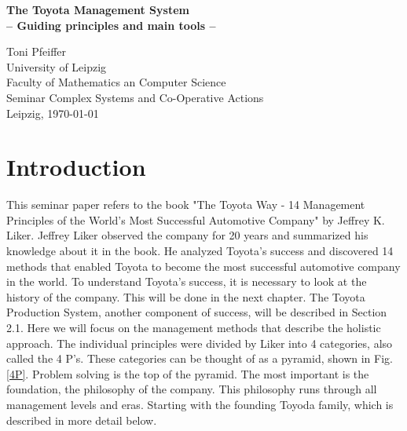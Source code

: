 \documentclass[a4paper,12pt]{scrartcl}
\begin{document}
\begin{titlepage}
\begin{center}


\vspace*{1cm}

\bigskip
\bigskip
\large


\bigskip
\bigskip
\bigskip
\bigskip
\bigskip
\bigskip
\bigskip
\bigskip
\bigskip
{\LARGE \bfseries The Toyota Management System   }\\
{\bfseries -- Guiding principles and main tools --}


\bigskip
\bigskip
\bigskip
\bigskip

Toni Pfeiffer \\

\bigskip
\bigskip
\bigskip
\bigskip
\bigskip
\bigskip
\bigskip
\bigskip
\bigskip
\bigskip
\bigskip
\bigskip
\bigskip
\bigskip
\bigskip
University of Leipzig \\
\bigskip
\bigskip
Faculty of Mathematics an Computer Science \\
\bigskip
Seminar Complex Systems and Co-Operative Actions \\
\bigskip
\bigskip
\bigskip
\bigskip
\bigskip
\bigskip
\bigskip
\bigskip
\bigskip
\bigskip
\bigskip
\bigskip
\bigskip
\bigskip
\bigskip
\bigskip
Leipzig, \today

\end{center}

\bigskip
\bigskip
\bigskip
\bigskip
\bigskip

\end{titlepage}

\clearpage
\tableofcontents
\clearpage
\clearpage
{}
\listoffigures
\clearpage

\section{Introduction}

This seminar paper refers to the book "The Toyota Way - 14 Management Principles of the World's Most Successful Automotive Company" by Jeffrey K. Liker. Jeffrey Liker observed the company for 20 years and summarized his knowledge about it in the book. He analyzed Toyota's success and discovered 14 methods that enabled Toyota to become the most successful automotive company in the world. To understand Toyota's success, it is necessary to look at the history of the company. This will be done in the next chapter. The Toyota Production System, another component of success, will be described in Section 2.1. Here we will focus on the management methods that describe the holistic approach. The individual principles were divided by Liker into 4 categories, also called the 4 P's. These categories can be thought of as a pyramid, shown in Fig. \ref{4P}. Problem solving is the top of the pyramid. The most important is the foundation, the philosophy of the company. This philosophy runs through all management levels and eras. Starting with the founding Toyoda family, which is described in more detail below.
\end{document}
